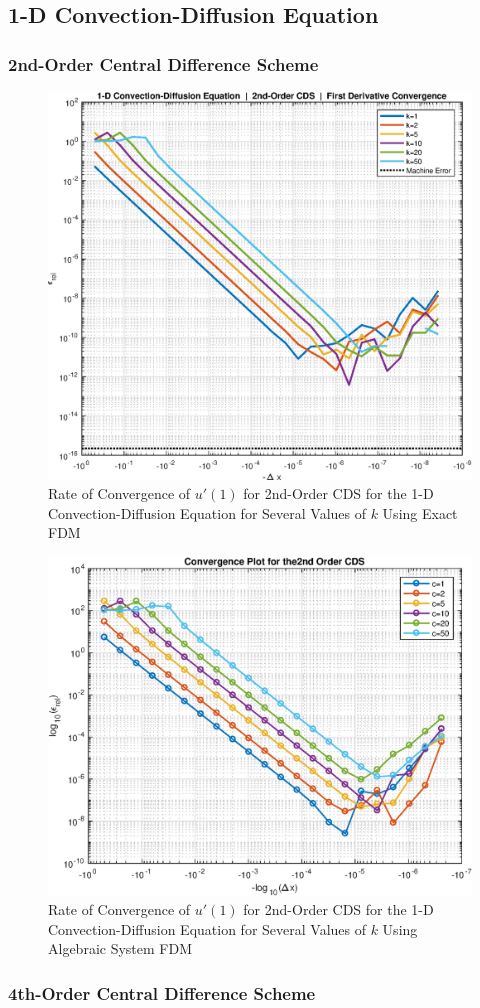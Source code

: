 \documentclass[10pt]{article}		%
\numberwithin{equation}{section}
\begin{document}
\subsection{1-D Convection-Diffusion Equation}

\subsubsection{2nd-Order Central Difference Scheme}

\begin{figure}[H]
	\begin{center}
		\includegraphics[width = 0.5\linewidth]{1dconv2oconv}
		\caption{Rate of Convergence of $u'(1)$ for 2nd-Order CDS for the 1-D Convection-Diffusion Equation for Several Values of $k$ Using Exact FDM}	
	\end{center}
\end{figure}

\begin{figure}[H]
	\begin{center}
		\includegraphics[width = 0.5\linewidth]{convergence_2nd_order_cds}
		\caption{Rate of Convergence of $u'(1)$ for 2nd-Order CDS for the 1-D Convection-Diffusion Equation for Several Values of $k$ Using Algebraic System FDM}	
	\end{center}
\end{figure}

\subsubsection{4th-Order Central Difference Scheme}
\end{document}

